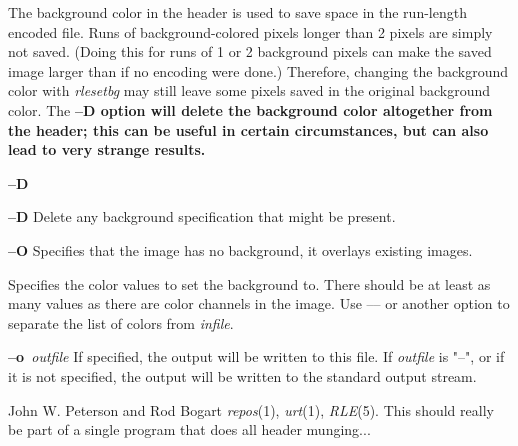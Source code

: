 The background color in the header is used to save space in the
run-length encoded file.  Runs of background-colored pixels longer
than 2 pixels are simply not saved.  (Doing this for runs of 1 or 2
background pixels can make the saved image larger than if no encoding
were done.)  Therefore, changing the background color with
{\it rlesetbg}
may still leave some pixels saved in the original background color.
The %
\bf --D \rm%
option will delete the background color altogether from
the header; this can be useful in certain circumstances, but can also
lead to very strange results.
\begin{TPlist}{{\bf --D}}
\item[{{\bf --D}}]
Delete any background specification that might be present.
\item[{{\bf --O}}]
Specifies that the image has no background, it overlays existing images.
\item[{%
\bf --c %
\it bgcolor ...%
\rm }]
Specifies the color values to set the background to.  There should be
at least as many values as there are color channels in the image.  Use
--\/-- or another option to separate the list of colors from 
{\it infile}{\rm .}
\item[{{\bf --o}{\it \ outfile}
}]
If specified, the output will be written to this file.  If 
{\it outfile}
is "--", or if it is not specified, the output will be written to the
standard output stream.
\end{TPlist}
John W. Peterson and Rod Bogart
{\it repos}{\rm (1),}
{\it urt}{\rm (1),}
{\it RLE}{\rm (5).}
This should really be part of a single program that does all header munging...
\newpage


